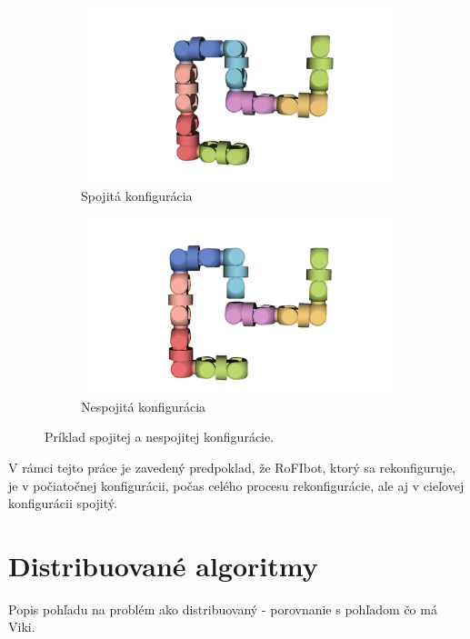 \documentclass[
  digital, %
  twoside, %
  table,   %
  nolof,     %
  nolot,     %
]{fithesis3}
\begin{document}
\begin{figure}[hbt!]
    \centering
    \begin{subfigure}[b]{0.49\textwidth}
        \includegraphics[width=\textwidth]{pictures/connected_rofibot.png}
        \caption[Spojitá konfigurácia.]{Spojitá konfigurácia}
        \label{fig:connectCfg}
    \end{subfigure}
    \begin{subfigure}[b]{0.49\textwidth}
        \includegraphics[width=\textwidth]{pictures/disconneted_rofibot.png}
        \caption[Nespojitá konfigurácia.]{Nespojitá konfigurácia}
        \label{fig:disconnectCfg}
    \end{subfigure}
    \caption[Príklad konfigurácie]{Príklad spojitej a nespojitej konfigurácie.}
    \label{fig:exampleCfg}
\end{figure}

V rámci tejto práce je zavedený predpoklad, že RoFIbot, ktorý sa rekonfiguruje, je v počiatočnej konfigurácii, počas celého procesu rekonfigurácie, ale aj v cieľovej konfigurácii spojitý. 

\chapter{Distribuované algoritmy}
\label{sec:distributedAlgo}
Popis pohľadu na problém ako distribuovaný - porovnanie s pohľadom čo má Viki. 
\end{document}
